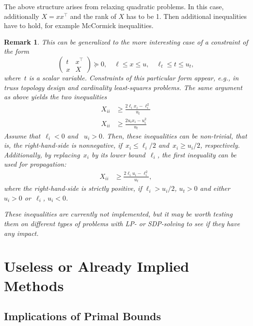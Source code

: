 \documentclass[10pt, a4paper]{article}
\newcommand{\T}{^{\top}}
\newtheorem{remark}[theorem]{Remark}
\begin{document}
The above structure arises from relaxing quadratic problems. In this case,
additionally $X = x x\T$ and the rank of $X$ has to be 1. Then additional
inequalities have to hold, for example McCormick inequalities.

\begin{remark}
  This can be generalized to the more interesting case of a
  constraint of the form
  \[
  \begin{pmatrix}
    t & x\T \\
    x & X
  \end{pmatrix}
  \succeq 0,
  \quad
  \ell \leq x \leq u,\quad \ell_t \leq t \leq u_t,
\]
where~$t$ is a scalar variable. Constraints of this particular form
appear, e.g., in truss topology design and cardinality least-squares
problems. The same argument as above yields the two inequalities
\begin{align*}
  X_{ii} &\geq \frac{2 \ell_i x_i - \ell_i^2}{u_t} \\
  X_{ii} &\geq \frac{2 u_i x_i - u_i^2}{u_t}
\end{align*}
Assume that~$\ell_i < 0$ and ~$u_i > 0$. Then, these inequalities can be
non-trivial, that is, the right-hand-side is nonnegative,
if~$x_i \leq \ell_i/2$ and~$x_i \geq u_i/2$, respectively. Additionally, by
replacing~$x_i$ by its lower bound~$\ell_i$, the first inequality can be
used for propagation:
\begin{align*}
  X_{ii} &\geq \frac{2 \ell_i u_i - \ell_i^2}{u_t},
\end{align*}
where the right-hand-side is strictly positive, if $\ell_i > u_i/2$, $u_t >
0$ and either~$u_i > 0$ or~$\ell_i$, $u_i < 0$.

These inequalities are currently not implemented, but it may be worth
testing them on different types of problems with LP- or SDP-solving to see
if they have any impact.
\end{remark}


\section{Useless or Already Implied Methods}


\subsection{Implications of Primal Bounds}
\end{document}
